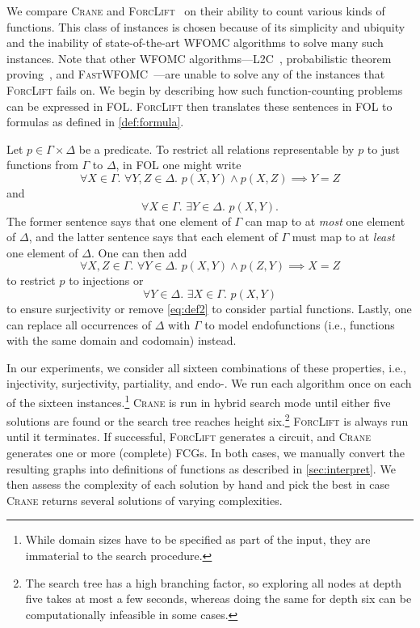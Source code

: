 \documentclass{article}
\theoremstyle{definition}
\begin{document}
We compare \textsc{Crane} and
\textsc{ForcLift}~\cite{DBLP:conf/ijcai/BroeckTMDR11} on their ability to count
various kinds of functions. This class of instances is chosen because of its
simplicity and ubiquity and the inability of state-of-the-art WFOMC algorithms
to solve many such instances. Note that other WFOMC
algorithms---\textsc{L2C}~\cite{DBLP:conf/kr/KazemiP16}, probabilistic theorem
proving~\cite{DBLP:journals/cacm/GogateD16}, and
\textsc{FastWFOMC}~\cite{DBLP:conf/uai/BremenK21}---are unable to solve any of
the instances that \textsc{ForcLift} fails on. We begin by describing how such
function-counting problems can be expressed in FOL\@. \textsc{ForcLift} then
translates these sentences in FOL to formulas as defined in \cref{def:formula}.

Let $p \in \Gamma \times \Delta$ be a predicate. To restrict all relations
representable by $p$ to just functions from $\Gamma$ to $\Delta$, in FOL one
might write
\[
  \forall X \in \Gamma\text{. }\forall Y,Z \in \Delta\text{. }p(X, Y) \land p(X, Z) \implies Y = Z
\]
and
\begin{equation}\label{eq:def2}
  \forall X \in \Gamma\text{. }\exists Y \in \Delta\text{. }p(X, Y).
\end{equation}
The former sentence says that one element of $\Gamma$ can map to at \emph{most}
one element of $\Delta$, and the latter sentence says that each element of
$\Gamma$ must map to at \emph{least} one element of $\Delta$. One can then add
\[
  \forall X,Z \in \Gamma\text{. }\forall Y \in \Delta\text{. }p(X, Y) \land p(Z, Y) \implies X = Z
\]
to restrict $p$ to injections or
\[
  \forall Y \in \Delta\text{. }\exists X \in \Gamma\text{. }p(X, Y)
\]
to ensure surjectivity or remove \cref{eq:def2} to consider partial functions.
Lastly, one can replace all occurrences of $\Delta$ with $\Gamma$ to model
endofunctions (i.e., functions with the same domain and codomain) instead.

In our experiments, we consider all sixteen combinations of these properties,
i.e., injectivity, surjectivity, partiality, and endo-. We run each algorithm
once on each of the sixteen instances.\footnote{While domain sizes have to be
  specified as part of the input, they are immaterial to the search procedure.}
\textsc{Crane} is run in hybrid search mode until either five solutions are
found or the search tree reaches height six.\footnote{The search tree has a high
  branching factor, so exploring all nodes at depth five takes at most a few
  seconds, whereas doing the same for depth six can be computationally
  infeasible in some cases.} \textsc{ForcLift} is always run until it
terminates. If successful, \textsc{ForcLift} generates a circuit, and
\textsc{Crane} generates one or more (complete) FCGs. In both cases, we manually
convert the resulting graphs into definitions of functions as described in
\cref{sec:interpret}. We then assess the complexity of each solution by hand and
pick the best in case \textsc{Crane} returns several solutions of varying
complexities.
\end{document}
